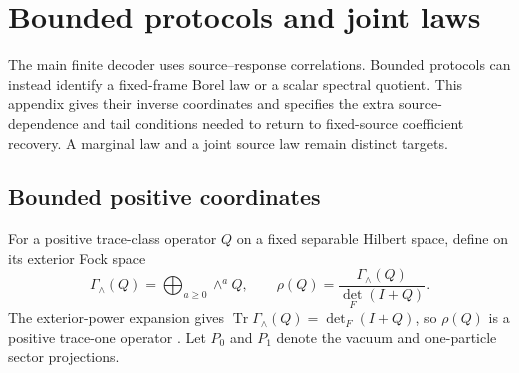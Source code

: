 \documentclass[11pt,a4paper]{amsart}
\numberwithin{equation}{section}
\theoremstyle{definition}
\theoremstyle{remark}
\DeclareMathOperator{\Tr}{Tr}
\begin{document}
\section{Bounded protocols and joint laws}\label{sec:obsappendix}
The main finite decoder uses source--response correlations. Bounded protocols can instead identify a fixed-frame Borel law or a scalar spectral quotient. This appendix gives their inverse coordinates and specifies the extra source-dependence and tail conditions needed to return to fixed-source coefficient recovery. A marginal law and a joint source law remain distinct targets.

\subsection{Bounded positive coordinates}
For a positive trace-class operator $Q$ on a fixed separable Hilbert space, define on its exterior Fock space
\begin{equation}\label{eq:extstate}
 \Gamma_\wedge(Q)=\bigoplus_{a\ge0}\wedge^aQ,\qquad
 \rho(Q)=\frac{\Gamma_\wedge(Q)}{\det_F(I+Q)}.
\end{equation}
The exterior-power expansion gives $\Tr\Gamma_\wedge(Q)=\det_F(I+Q)$, so $\rho(Q)$ is a positive trace-one operator \cite{Simon,Bornemann}. Let $P_0$ and $P_1$ denote the vacuum and one-particle sector projections.
\end{document}
